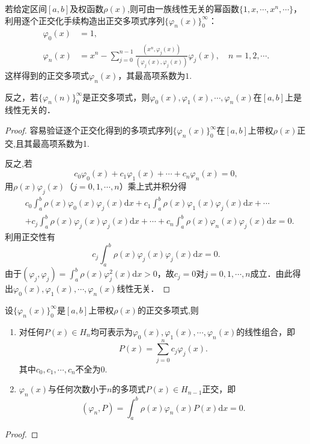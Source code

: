 \documentclass[../../main.tex]{subfiles}
\begin{document}
\begin{theorem}
若给定区间$[a,b]$及权函数$\rho(x)$,则可由一族线性无关的幂函数$\{1,x,\cdots,x^n,\cdots\}$，利用逐个正交化手续构造出正交多项式序列$\{\varphi_n(x)\}_{0}^{\infty}$：
\begin{align}
\varphi_0(x) &= 1, \nonumber \\
\varphi_n(x) &= x^n - \sum_{j=0}^{n-1} \frac{(x^n, \varphi_j(x))}{(\varphi_j(x), \varphi_j(x))} \varphi_j(x),\quad n=1,2,\cdots.\label{eq:数值分析-3-2.3}
\end{align}
这样得到的正交多项式$\varphi_n(x)$，其最高项系数为$1$.

反之，若$\{\varphi_n(n)\}_{0}^{\infty}$是正交多项式，则$\varphi_0(x),\varphi_1(x),\cdots,\varphi_n(x)$在$[a,b]$上是线性无关的．
\end{theorem}
\begin{proof}
容易验证逐个正交化得到的多项式序列$\{\varphi_n(x)\}_{0}^{\infty}$在$[a,b]$上带权$\rho(x)$正交,且其最高项系数为1.

反之,若
$$c_0\varphi_0(x) + c_1\varphi_1(x) + \cdots + c_n\varphi_n(x) = 0,$$
用$\rho(x)\varphi_j(x)$（$j=0,1,\cdots,n$）乘上式并积分得
\begin{align*}
&c_0\int_a^b{\rho (x)\varphi _0(x)\varphi _j(x)\mathrm{d}x}+c_1\int_a^b{\rho (x)\varphi _1(x)\varphi _j(x)\mathrm{d}x}+\cdots 
\\
&+c_j\int_a^b{\rho (x)\varphi _j(x)\varphi _j(x)\mathrm{d}x}+\cdots +c_n\int_a^b{\rho (x)\varphi _n(x)\varphi _j(x)\mathrm{d}x}=0.
\end{align*}
利用正交性有
$$c_j\int_a^b \rho(x)\varphi_j(x)\varphi_j(x)\mathrm{d}x = 0.$$
由于$(\varphi_j,\varphi_j) = \int_a^b \rho(x)\varphi_j^2(x)\mathrm{d}x > 0$，故$c_j = 0$对$j=0,1,\cdots,n$成立．由此得出$\varphi_0(x),\varphi_1(x),\cdots,\varphi_n(x)$线性无关．

\end{proof}

\begin{theorem}\label{theorem:正交多项式的性质}
设$\{\varphi_n(x)\}_{0}^{\infty}$是$[a,b]$上带权$\rho(x)$的正交多项式,则
\begin{enumerate}
\item 对任何$P(x) \in H_n$均可表示为$\varphi_0(x),\varphi_1(x),\cdots,\varphi_n(x)$的线性组合，即
$$P(x) = \sum_{j=0}^n c_j\varphi_j(x).$$
其中$c_0,c_1,\cdots,c_n$不全为0.

\item $\varphi_n(x)$与任何次数小于$n$的多项式$P(x) \in H_{n-1}$正交，即
$$(\varphi_n, P) = \int_a^b \rho(x)\varphi_n(x)P(x)\mathrm{d}x = 0.$$
\end{enumerate}
\end{theorem}
\begin{proof}


\end{proof}
\end{document}
